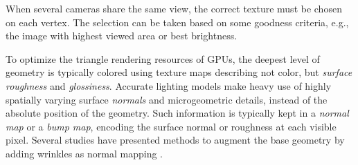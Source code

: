 When several cameras share the same view, the correct texture must be chosen on each vertex.
The selection can be taken based on some goodness criteria, e.g., the image with highest viewed area or best brightness.


To optimize the triangle rendering resources of GPUs, the deepest level of geometry is typically colored using texture maps describing not color, but \emph{surface roughness} and \emph{glossiness}.
Accurate lighting models make heavy use of highly spatially varying surface \emph{normals} and microgeometric details, instead of the absolute position of the geometry.
Such information is typically kept in a \emph{normal map} or a \emph{bump map}, encoding the surface normal or roughness at each visible pixel.
Several studies have presented methods to augment the base geometry by adding wrinkles as normal mapping \cite{bickel2007multi}.




%
%
%
%
%


